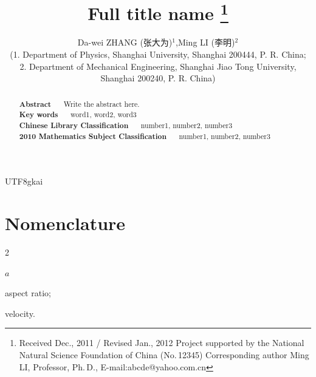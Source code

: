 \documentclass[a4paper, 11pt, twoside]{article}
\begin{document}

\begin{CJK*}{UTF8}{gkai} %

\title{{\large  \textbf{Full title name}}%
\thanks{\footnotesize{Received Dec., 2011 / Revised Jan.,
2012
\newline%
Project supported by the National Natural Science Foundation of
China (No.\,12345)
\newline
Corresponding author Ming LI, Professor, Ph.\,D.,
E-mail:\;abcde@yahoo.com.cn}}}
\author{\small{Da-wei ZHANG (张大为)$^{1}$,\quad  Ming LI (李\quad 明)$^2$} %
\\[2mm]
\footnotesize{(1. Department of Physics, Shanghai University, Shanghai 200444, P. R. China;} %
\\
\footnotesize{ 2. Department of Mechanical Engineering, Shanghai Jiao Tong University, Shanghai 200240, P. R. China)} %
 } %


\maketitle %
\thispagestyle{first}
\footnotesize
\begin{abstract}
\noindent \textbf{Abstract~~~}Write the abstract here.
\\[2mm]
\textbf{Key words~~~}word1, word2, word3
\\[2mm]
\textbf{Chinese Library Classification~~~}number1, number2, number3
\\
\textbf{2010 Mathematics Subject Classification~~~}number1, number2,
number3
\end{abstract}



\section*{\small Nomenclature}%
\footnotesize

\setlength{\columnsep}{5mm}
\begin{multicols}{2}
\begin{zk}{$a$\quad}
\item[$a$,]aspect ratio;
\item[$v$,]velocity.
\end{zk}
\end{multicols}



\end{CJK*}
\end{document}

